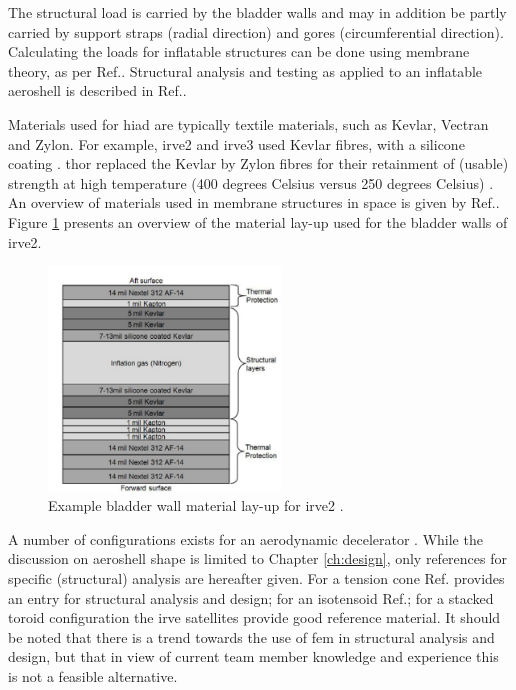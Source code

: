 The structural load is carried by the bladder walls and may in addition be partly carried by support straps (radial direction) and gores (circumferential direction). Calculating the loads for inflatable structures can be done using membrane theory, as per Ref.\cite{Young2002}. Structural analysis and testing as applied to an inflatable aeroshell is described in Ref.\cite{Lindell2006}.

Materials used for \gls{hiad} are typically textile materials, such as Kevlar, Vectran and Zylon. For example, \gls{irve2} and \gls{irve3} used Kevlar fibres, with a silicone coating \cite{Dillman2012a}. \gls{thor} replaced the Kevlar by Zylon fibres for their retainment of (usable) strength at high temperature (400 degrees Celsius versus 250 degrees Celsius) \cite{Dillman2014}. An overview of materials used in membrane structures in space is given by Ref.\cite{Jenkins2001}. Figure \ref{fig:matlayup} presents an overview of the material lay-up used for the bladder walls of \gls{irve2}.

\begin{figure}[H]
\centering
\includegraphics[width = 0.55\textwidth]{Figure/IRVE2_bladder_mat.PNG}
\caption[Example bladder wall material lay-up for \gls{irve2}]{Example bladder wall material lay-up for \gls{irve2} \cite[p.2]{Dillman2010}.}
\label{fig:matlayup}
\end{figure}

A number of configurations exists for an aerodynamic decelerator \cite{Smith2010}. While the discussion on aeroshell shape is limited to Chapter \ref{ch:design}, only references for specific (structural) analysis are hereafter given. For a tension cone Ref.\cite{Yamada2009} provides an entry for structural analysis and design; for an isotensoid Ref.\cite{Smith2011}; for a stacked toroid configuration the \gls{irve} satellites provide good reference material. It should be noted that there is a trend towards the use of \gls{fem} in structural analysis and design, but that in view of current team member knowledge and experience this is not a feasible alternative.

